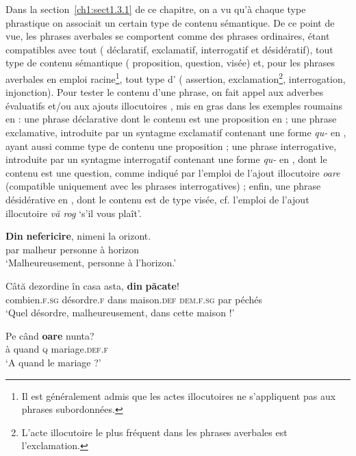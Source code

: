 Dans la section~\ref{ch1:sect1.3.1} de ce chapitre, on a vu qu’à chaque type phrastique on associait un certain type de contenu sémantique. De ce point de vue, les phrases averbales se comportent comme des phrases ordinaires, étant compatibles avec tout  ({\cad} déclaratif, exclamatif, interrogatif et désidératif), tout type de contenu sémantique ({\cad} proposition, question, visée) et, pour les phrases averbales en emploi racine\footnote{Il est généralement admis que les actes illocutoires ne s’appliquent pas aux phrases subordonnées.}, tout type d’ ({\cad} assertion, exclamation\footnote{L’acte illocutoire le plus fréquent dans les phrases averbales est l’exclamation.}, interrogation, injonction). Pour tester le contenu d’une phrase, on fait appel aux adverbes évaluatifs et/ou aux ajouts illocutoires \citep{BonamiEtAl2005,BeyssadeEtAl2006}, mis en gras dans les exemples roumains en  : une phrase déclarative dont le contenu est une proposition en  ; une phrase exclamative, introduite par un syntagme exclamatif contenant une forme \textit{qu-} en , ayant aussi comme type de contenu une proposition ; une phrase interrogative, introduite par un syntagme interrogatif contenant une forme \textit{qu-} en , dont le contenu est une question, comme indiqué par l’emploi de l’ajout illocutoire \textit{oare} (compatible uniquement avec les phrases interrogatives) ; enfin, une phrase désidérative en , dont le contenu est de type visée, cf. l’emploi de l’ajout illocutoire \textit{vă rog} ‘s’il vous plaît’. 

\ea \label{ch1:ex39}
\ea
\gll   \textbf{Din} \textbf{nefericire},  nimeni  la  orizont. \label{ch1:ex39a}\\
par  malheur  personne  à  horizon\\
\glt ‘Malheureusement, personne à l’horizon.’ 

\ex
\gll  Câtă  dezordine  în  casa  asta,  \textbf{din} \textbf{păcate}! \label{ch1:ex39b}\\
    combien\textsc{.f.sg}  désordre.\textsc{f}  dans  maison.\textsc{def}  \textsc{dem.f.sg}  par  péchés\\
\glt ‘Quel désordre, malheureusement, dans cette maison !’ 

\ex 
\gll Pe  când  \textbf{oare}  nunta? \label{ch1:ex39c}\\
    à  quand  \textsc{q}  mariage.\textsc{def.f} \\
\glt ‘A quand le mariage ?’ 

